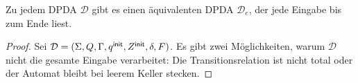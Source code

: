 \begin{lemma}[name={[\acs*{DPDA}, der gesamte Eingabe verarbeitet]}]
        \label{lem:DPDA ges. Eingabe}
        Zu jedem \ac{DPDA} $\mathcal{D}$ gibt es einen äquivalenten \ac{DPDA} $\mathcal{D}_e$, der
        jede Eingabe bis zum Ende liest.
\end{lemma}
\begin{proof}

  Sei $\mathcal{D} = (\Sigma, Q, \Gamma, q^\mathsf{init}, Z^\mathsf{init}, \delta, F)$. 
  Es gibt zwei Möglichkeiten, warum $\mathcal{D}$ nicht die gesamte Eingabe verarbeitet:
  Die Transitionsrelation ist nicht total 
  oder der Automat bleibt bei
  leerem Keller stecken.


\end{proof}
